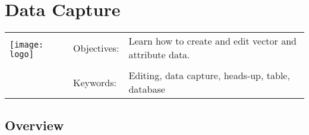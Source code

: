 

\section{Data Capture}\label{sec:datacapture}
\begin{tabular}{p{3.5cm}p{6cm}p{6cm}}
\multirow{2}{*}{\texttt{[image: logo]}} & Objectives: &
Learn how to create and edit vector and attribute data. \\
& & \\
& Keywords: & 
Editing, data capture, heads-up, table, database  \\
\hline
\end{tabular}

\subsection{Overview}\label{subsec:overview}



